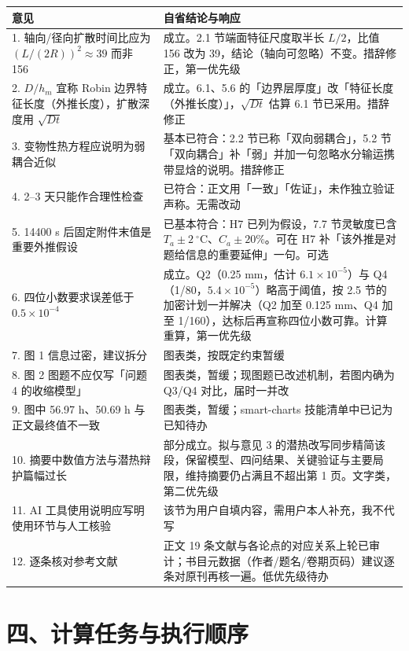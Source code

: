 \documentclass[12pt,a4paper]{ctexart}
\begin{document}
\begin{center}
{\begin{tabular}{p{}p{}}
\toprule
意见 & 自省结论与响应 \\
\midrule
1. 轴向/径向扩散时间比应为 $(L/(2R))^2\approx39$ 而非 156 & 成立。2.1 节端面特征尺度取半长 $L/2$，比值 156 改为 39，结论（轴向可忽略）不变。措辞修正，第一优先级 \\
2. $D/h_m$ 宜称 Robin 边界特征长度（外推长度），扩散深度用 $\sqrt{Dt}$ & 成立。6.1、5.6 的「边界层厚度」改「特征长度（外推长度）」，$\sqrt{Dt}$ 估算 6.1 节已采用。措辞修正 \\
3. 变物性热方程应说明为弱耦合近似 & 基本已符合：2.2 节已称「双向弱耦合」，5.2 节「双向耦合」补「弱」并加一句忽略水分输运携带显焓的说明。措辞修正 \\
4. 2--3 天只能作合理性检查 & 已符合：正文用「一致」「佐证」，未作独立验证声称。无需改动 \\
5. 14400 s 后固定附件末值是重要外推假设 & 已基本符合：H7 已列为假设，7.7 节灵敏度已含 $T_a\pm2\ ^\circ$C、$C_a\pm20\%$。可在 H7 补「该外推是对题给信息的重要延伸」一句。可选 \\
6. 四位小数要求误差低于 $0.5\times10^{-4}$ & 成立。Q2（0.25 mm，估计 $6.1\times10^{-5}$）与 Q4（1/80，$5.4\times10^{-5}$）略高于阈值，按 2.5 节的加密计划一并解决（Q2 加至 0.125 mm、Q4 加至 1/160），达标后再宣称四位小数可靠。计算重算，第一优先级 \\
7. 图 1 信息过密，建议拆分 & 图表类，按既定约束暂缓 \\
8. 图 2 图题不应仅写「问题 4 的收缩模型」 & 图表类，暂缓；现图题已改述机制，若图内确为 Q3/Q4 对比，届时一并改 \\
9. 图中 56.97 h、50.69 h 与正文最终值不一致 & 图表类，暂缓；smart-charts 技能清单中已记为已知待办 \\
10. 摘要中数值方法与潜热辩护篇幅过长 & 部分成立。拟与意见 3 的潜热改写同步精简该段，保留模型、四问结果、关键验证与主要局限，维持摘要仍占满且不超出第 1 页。文字类，第二优先级 \\
11. AI 工具使用说明应写明使用环节与人工核验 & 该节为用户自填内容，需用户本人补充，我不代写 \\
12. 逐条核对参考文献 & 正文 19 条文献与各论点的对应关系上轮已审计；书目元数据（作者/题名/卷期页码）建议逐条对原刊再核一遍。低优先级待办 \\
\bottomrule
\end{tabular}}
\end{center}

\section{四、计算任务与执行顺序}
\end{document}
